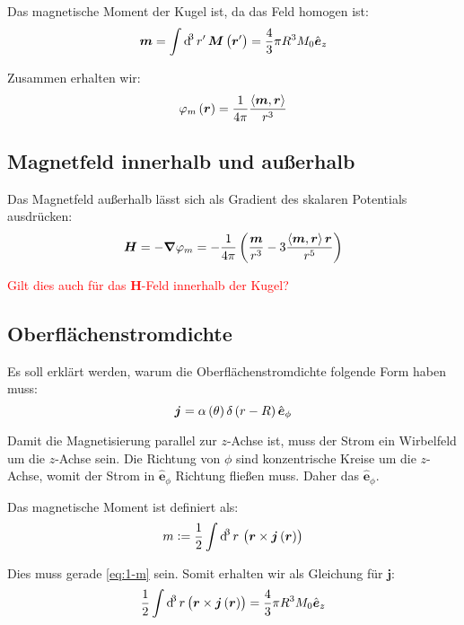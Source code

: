 \documentclass[11pt, ngerman, fleqn]{article}
\newcommand{\ev}{\hat{\vec e}}
\newcommand{\half}{\frac 12}
\newcommand{\inner}[2]{\left\langle #1, #2 \right\rangle}
\newcommand{\vnabla}{\vec \nabla}
\renewcommand{\vec}[1]{\boldsymbol{#1}}
\begin{document}
Das magnetische Moment der Kugel ist, da das Feld homogen ist:
\begin{equation}
	\label{eq:1-m}
	\vec m = \int \dif^3 r' \, \vec M \del{\vec r'} = \frac 43 \pi R^3 M_0 \ev_z
\end{equation}

Zusammen erhalten wir:
\[
	\varphi_m \del{\vec r}
	= \frac{1}{4\pi} \frac{\inner{\vec m}{\vec r}}{r^3}
\]

\subsection{Magnetfeld innerhalb und außerhalb}

Das Magnetfeld außerhalb lässt sich als Gradient des skalaren Potentials
ausdrücken:
\[
	\vec H
	= - \vnabla \varphi_m
	= - \frac{1}{4 \pi} \del{\frac{\vec m}{r^3} - 3 \frac{\inner{\vec m}{\vec r} \vec r}{r^5}}
\]

\textcolor{red}{Gilt dies auch für das $\vec H$-Feld innerhalb der Kugel?}

\subsection{Oberflächenstromdichte}

Es soll erklärt werden, warum die Oberflächenstromdichte folgende Form haben
muss:
\[
	\vec j = \alpha\del\theta \delta\del{r-R} \ev_\phi
\]

Damit die Magnetisierung parallel zur $z$-Achse ist, muss der Strom ein
Wirbelfeld um die $z$-Achse sein. Die Richtung von $\phi$ sind konzentrische
Kreise um die $z$-Achse, womit der Strom in $\ev_\phi$ Richtung fließen
muss. Daher das $\ev_\phi$.

Das magnetische Moment ist definiert als:
\[
	m := \half \int \dif^3 r \, \del{\vec r \times \vec j\del{\vec r}}
\]

Dies muss gerade \eqref{eq:1-m} sein. Somit erhalten wir als Gleichung für $\vec j$:
\[
	\half \int \dif^3 r \del{\vec r \times \vec j\del{\vec r}}
	= \frac 43 \pi R^3 M_0 \ev_z
\]
\end{document}
